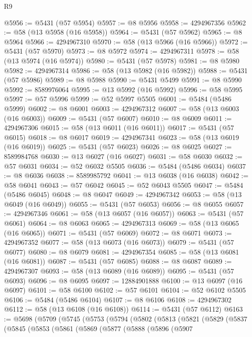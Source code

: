 \begin{lexlean}{R9}
\begin{coremodule}
@5956 := @5431 (@57 @5954)
@5957 := @8 @5956
@5958 := 4294967356
@5962 := @58 (@13 @5958 (@16 @5958))
@5964 := @5431 (@57 @5962)
@5965 := @8 @5964
@5966 := 4294967310
@5970 := @58 (@13 @5966 (@16 @5966))
@5972 := @5431 (@57 @5970)
@5973 := @8 @5972
@5974 := 4294967311
@5978 := @58 (@13 @5974 (@16 @5974))
@5980 := @5431 (@57 @5978)
@5981 := @8 @5980
@5982 := 4294967314
@5986 := @58 (@13 @5982 (@16 @5982))
@5988 := @5431 (@57 @5986)
@5989 := @8 @5988
@5990 := @5431 @5499
@5991 := @8 @5990
@5992 := 8589976064
@5995 := @13 @5992 (@16 @5992)
@5996 := @58 @5995
@5997 := @57 @5996
@5999 := @52 @5997 @5505
@6001 := @5484 (@5486 @5999)
@6002 := @8 @6001
@6003 := 4294967312
@6007 := @58 (@13 @6003 (@16 @6003))
@6009 := @5431 (@57 @6007)
@6010 := @8 @6009
@6011 := 4294967306
@6015 := @58 (@13 @6011 (@16 @6011))
@6017 := @5431 (@57 @6015)
@6018 := @8 @6017
@6019 := 4294967341
@6023 := @58 (@13 @6019 (@16 @6019))
@6025 := @5431 (@57 @6023)
@6026 := @8 @6025
@6027 := 8589984768
@6030 := @13 @6027 (@16 @6027)
@6031 := @58 @6030
@6032 := @57 @6031
@6034 := @52 @6032 @5505
@6036 := @5484 (@5486 @6034)
@6037 := @8 @6036
@6038 := 8589985792
@6041 := @13 @6038 (@16 @6038)
@6042 := @58 @6041
@6043 := @57 @6042
@6045 := @52 @6043 @5505
@6047 := @5484 (@5486 @6045)
@6048 := @8 @6047
@6049 := 4294967342
@6053 := @58 (@13 @6049 (@16 @6049))
@6055 := @5431 (@57 @6053)
@6056 := @8 @6055
@6057 := 4294967346
@6061 := @58 (@13 @6057 (@16 @6057))
@6063 := @5431 (@57 @6061)
@6064 := @8 @6063
@6065 := 4294967313
@6069 := @58 (@13 @6065 (@16 @6065))
@6071 := @5431 (@57 @6069)
@6072 := @8 @6071
@6073 := 4294967352
@6077 := @58 (@13 @6073 (@16 @6073))
@6079 := @5431 (@57 @6077)
@6080 := @8 @6079
@6081 := 4294967354
@6085 := @58 (@13 @6081 (@16 @6081))
@6087 := @5431 (@57 @6085)
@6088 := @8 @6087
@6089 := 4294967307
@6093 := @58 (@13 @6089 (@16 @6089))
@6095 := @5431 (@57 @6093)
@6096 := @8 @6095
@6097 := 12884901888
@6100 := @13 @6097 (@16 @6097)
@6101 := @58 @6100
@6102 := @57 @6101
@6104 := @52 @6102 @5505
@6106 := @5484 (@5486 @6104)
@6107 := @8 @6106
@6108 := 4294967302
@6112 := @58 (@13 @6108 (@16 @6108))
@6114 := @5431 (@57 @6112)
@6163 := @5698
    (@5709
      (@5745
        (@5753
          (@5794
            (@5802
              (@5813
                (@5821
                  (@5829
                    (@5837
                      (@5845
                        (@5853
                          (@5861
                            (@5869
                              (@5877
                                (@5888
                                  (@5896
                                    (@5907

\end{coremodule}
\end{lexlean}

